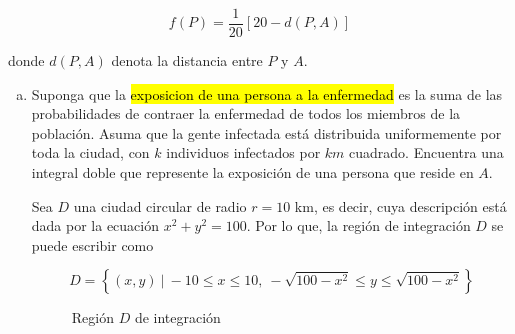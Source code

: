 \documentclass[12pt]{exam}
\begin{document}
\begin{questions}

  
  \begin{equation}
    f(P)=\frac{1}{20}\left[20-d\left(P,A\right)\right]
  \end{equation}
  
  donde $d\left(P,A\right)$ denota la distancia entre $P$ y $A$.

  \begin{enumerate}[a)]
  \item Suponga que la \hl{exposicion de una persona a la enfermedad} es la suma de las probabilidades de contraer la enfermedad de todos los miembros de la población. Asuma que la gente infectada está distribuida uniformemente por toda la ciudad, con $k$ individuos infectados por $km$ cuadrado. Encuentra una integral doble que represente la exposición de una persona que reside en $A$.

    \vspace{0.5cm}

    Sea $D$ una ciudad circular de radio $r=10$ km, es decir, cuya descripción está dada por la ecuación $x^2+y^2=100$. Por lo que, la región de integración $D$ se puede escribir como

    \[
    D=\left\{(x,y)~|~ -10 \leq x \leq 10, ~ -\sqrt{100-x^2} \leq y \leq \sqrt{100-x^2} \right\}
    \]

    \begin{figure}[H]
      \centering

      \caption{Región $D$ de integración}
    \end{figure}


\end{enumerate}
\end{questions}
\end{document}
